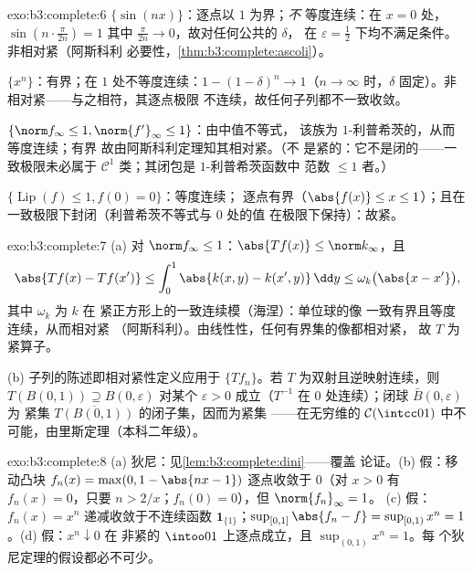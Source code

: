 \begin{solution}{exo:b3:complete:6}
$\{\sin(nx)\}$：逐点以 $1$ 为界；\emph{不}
等度连续：在 $x = 0$ 处，$\sin(n\cdot\frac{\pi}{2n}) = 1$
其中 $\frac\pi{2n} \to 0$，故对任何公共的 $\delta$，
在 $\varepsilon = \frac12$ 下均不满足条件。非相对紧（阿斯科利
必要性，\cref{thm:b3:complete:ascoli}）。

$\{x^n\}$：有界；在 $1$ 处不等度连续：$1 - (1 -
\delta)^n \to 1$（$n \to \infty$ 时，$\delta$ 固定）。非
相对紧——与之相符，其逐点极限
不连续，故任何子列都不一致收敛。

$\{\norm f_\infty \leq 1, \norm{f'}_\infty \leq 1\}$：由中值不等式，
该族为 $1$-利普希茨的，从而等度连续；有界
故由阿斯科利定理知其相对紧。（不
是紧的：它不是闭的——一致极限未必属于
$\mathcal C^1$ 类；其闭包是 $1$-利普希茨函数中
范数 $\leq 1$ 者。）

$\{\operatorname{Lip}(f) \leq 1, f(0) = 0\}$：等度连续；
逐点有界（$\abs{f(x)} \leq x \leq 1$）；且在
一致极限下封闭（利普希茨不等式与 $0$ 处的值
在极限下保持）：故紧。
\end{solution}

\begin{solution}{exo:b3:complete:7}
(a) 对 $\norm f_\infty \leq 1$：$\abs{Tf(x)} \leq
\norm k_\infty$，且
\[
\abs{Tf(x) - Tf(x')} \leq \int_0^1\abs{k(x,y) -
k(x',y)}\,\dd y \leq \omega_k\bigl(\abs{x - x'}\bigr),
\]
其中 $\omega_k$ 为 $k$ 在
紧正方形上的一致连续模（海涅）：单位球的像
一致有界且等度连续，从而相对紧
（阿斯科利）。由线性性，任何有界集的像都相对紧，
故 $T$ 为紧算子。

(b) 子列的陈述即相对紧性定义应用于 $\{Tf_n\}$。若
$T$ 为双射且逆映射连续，则
$T(B(0,1)) \supseteq B(0,
\varepsilon)$ 对某个 $\varepsilon > 0$ 成立（$T^{-1}$ 在
$0$ 处连续）；闭球 $\bar B(0,\varepsilon)$ 为
紧集 $\overline{T(B(0,1))}$ 的闭子集，因而为紧集
——在无穷维的 $\mathcal
C(\intcc01)$ 中不可能，由里斯定理（本科二年级）。
\end{solution}

\begin{solution}{exo:b3:complete:8}
(a) 狄尼：见\cref{lem:b3:complete:dini}——覆盖
论证。(b) 假：移动凸块 $f_n(x) = \max(0, 1 -
\abs{nx - 1})$ 逐点收敛于 $0$（对 $x > 0$ 有 $f_n(x) =
0$，只要 $n > 2/x$；$f_n(0) = 0$），但 $\norm{f_n}_\infty = 1$。
(c) 假：$f_n(x) = x^n$ 递减收敛于不连续函数
$\mathbf 1_{\{1\}}$；$\sup_{[0,1]}\abs{f_n - f} = \sup_{[0,1)}
x^n = 1$。(d) 假：$x^n \downarrow 0$ 在
非紧的 $\intoo01$ 上逐点成立，且 $\sup_{(0,1)}x^n = 1$。每
个狄尼定理的假设都必不可少。
\end{solution}

